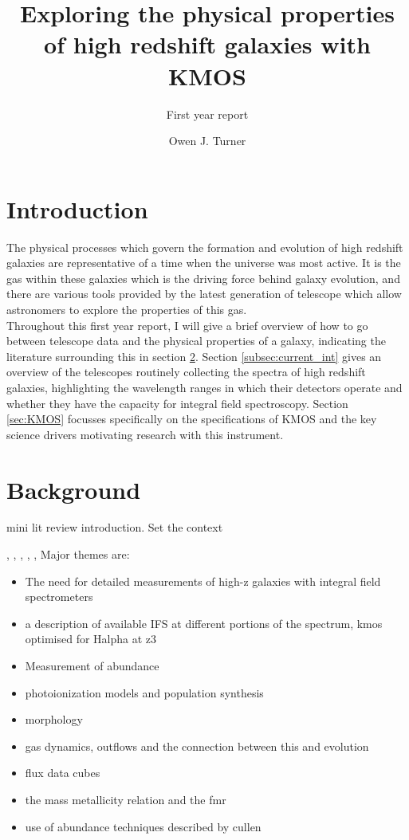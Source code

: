 \documentclass{literature}
\title{Exploring the physical properties of high redshift galaxies with KMOS}
\subtitle{First year report}
\author{Owen J. Turner}
\begin{document}
\coverpage





\section{Introduction}\label{sec:Intro}
The physical processes which govern the formation and evolution of high redshift galaxies are representative of a time when the universe was most active. It is the gas within these galaxies which is the driving force behind galaxy evolution, and there are various tools provided by the latest generation of telescope which allow astronomers to explore the properties of this gas. \\ 



Throughout this first year report, I will give a brief overview of how to go between telescope data and the physical properties of a galaxy, indicating the literature surrounding this in section \ref{sec:background}. Section \ref{subsec:current_int} gives an overview of the telescopes 
routinely collecting the spectra of high redshift galaxies, highlighting the wavelength ranges in which their detectors operate and whether 
they have the capacity for integral field spectroscopy. Section \ref{sec:KMOS} focusses specifically on the specifications of KMOS and the key science drivers motivating research with this instrument. 





\section{Background}\label{sec:background}
mini lit review introduction. Set the context 

\citep{Troncoso_2014}, \citep{Maiolino2008}, \citep{Cullen2014}, \citep{Kewley2002}, \citep{Kennicutt_2012}, \citep{Tremonti2004} \citep{Brinchmann2004} \citep{Savaglio2005} \citep{Erb_2006} \citep{Kewley_2008} \citep{ForsterSchreiber2009} \citep{Steidel2014}
Major themes are: 

\begin{itemize}
	\item The need for detailed measurements of high-z galaxies with integral field spectrometers 
	\item a description of available IFS at different portions of the spectrum, kmos optimised for Halpha at z3
	\item Measurement of abundance 
	\item photoionization models and population synthesis
	\item morphology 
	\item gas dynamics, outflows and the connection between this and evolution 
	\item flux data cubes 
	\item the mass metallicity relation and the fmr 
	\item use of abundance techniques described by cullen 
\end{itemize}
\end{document}
